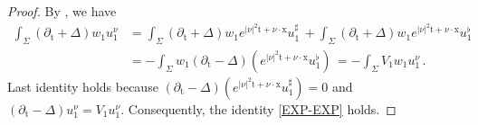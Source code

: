 \documentclass[10pt,a4paper]{amsart}
\theoremstyle{remark}
\theoremstyle{definition}
\newcommand{\tm}{\mathrm{t}}
\newcommand{\x}{\mathrm{x}}
\begin{document}
\begin{proof}
By , we have
\begin{align*}
\int_{\Sigma}\left( \partial_{\tm}+\Delta\right) w_1 u_1^{\nu} &=
\int_{\Sigma}\left( \partial_{\tm}+\Delta\right) w_1 e^{|\nu|^2 \tm + \nu \cdot \x} u_1^\sharp \, + \int_{\Sigma}\left( \partial_{\tm}+\Delta\right) w_1 e^{|\nu|^2 \tm + \nu \cdot \x} u_1^\flat \, \\
&= - \int_{\Sigma} w_1 \left( \partial_{\tm}-\Delta\right) (e^{|\nu|^2 \tm + \nu \cdot \x} u_1^\flat) \, = - \int_{\Sigma} V_1 w_1 u_1^{\nu} \, .
\end{align*}
Last identity holds because 
$\left( \partial_{\tm} - \Delta\right)(e^{|\nu|^2 \tm + \nu \cdot \x} u_1^\sharp) = 0$ and
$\left( \partial_{\tm} - \Delta\right) u_1^\nu = V_1 u_1^\nu$. Consequently, the identity \eqref{EXP-EXP} holds.
\end{proof}
\end{document}
